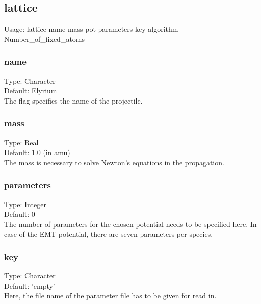 \documentclass[twoside, 11pt, titlepage, captions=nooneline, a4paper, headsepline]{scrbook}%
\begin{document}
\subsection*{lattice}
Usage: lattice name mass pot parameters key algorithm Number\_of\_fixed\_atoms
\subsubsection*{name}
Type: Character\\
Default: Elyrium\\
The flag specifies the name of the projectile.
\subsubsection*{mass}
Type: Real\\
Default: 1.0 (in amu)\\
The mass is necessary to solve Newton's equations in the propagation.
\subsubsection*{parameters}
Type: Integer \\
Default: 0\\
The number of parameters for the chosen potential needs to be specified here. In case of the EMT-potential, there are seven parameters per species.
\subsubsection*{key}
Type: Character\\
Default: 'empty'\\
Here, the file name of the parameter file has to be given for read in.
\end{document}
